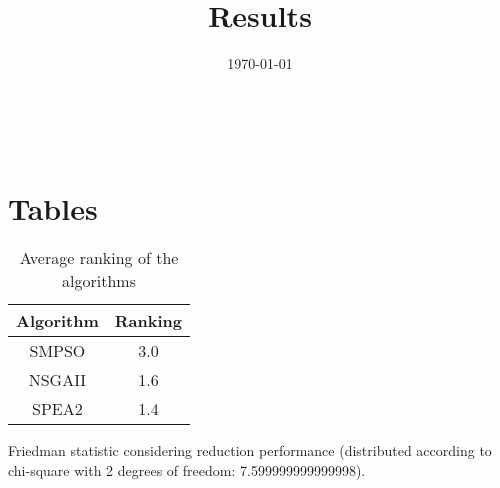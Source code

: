 \documentclass{article}
\title{Results}
\author{}
\date{\today}
\begin{document}
\oddsidemargin 0in \topmargin 0in\maketitle
\
\section{Tables}
\begin{table}[!htp]
\centering
\caption{Average ranking of the algorithms}
\begin{tabular}{c|c}
Algorithm&Ranking\\
\hline
SMPSO&3.0\\
NSGAII&1.6\\
SPEA2&1.4\\
\end{tabular}
\end{table}


Friedman statistic considering reduction performance (distributed according to chi-square with 2 degrees of freedom: 7.599999999999998).
\end{document}
